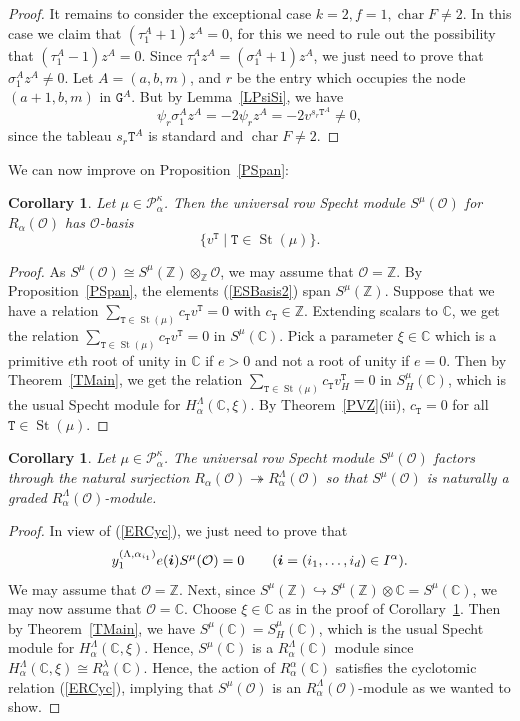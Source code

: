 \documentclass[twoside,11pt,reqno]{amsart}
\numberwithin{equation}{section}
\newtheorem{Corollary}[equation]{Corollary}
\theoremstyle{definition}  %
\def\bi{\text{\boldmath$i$}}
\newcommand{\cha}{\operatorname{char}}
\newcommand{\St}{\operatorname{St}}
\newcommand{\Z}{\mathbb{Z}}
\newcommand{\0}{{\bar 0}}
\newcommand{\1}{{\bar 1}}
\newcommand{\La}{\Lambda}
\newcommand{\al}{\alpha}
\newcommand{\si}{\sigma}
\newcommand{\C}{{\mathbb C}}
\newcommand\Par[1][]{{\mathscr P}^{\kappa#1}}
\def\T{{\mathtt T}}
\def\G{{\mathtt G}}
\def\onto{{\twoheadrightarrow}}
\def\into{{\hookrightarrow}}
\renewcommand\O{\mathcal O}
\begin{document}
\begin{proof}
It remains to consider the exceptional case $k=2,f=1,\cha F\neq 2$. In this case we claim that
$(\tau_1^A+1)z^A=0$, for this we need to rule out the possibility that $(\tau_1^A-1)z^A=0$.
Since $\tau_1^Az^A=(\si_1^A+1)z^A$, we just need to prove that $\si_1^Az^A\neq 0$. Let
$A=(a,b,m)$, and $r$ be the entry which occupies the node $(a+1,b,m)$ in $\G^A$. But by
Lemma~\ref{LPsiSi}, we have $$\psi_r \si_1^Az^A=-2\psi_rz^A=-2v^{s_r\T^A}\neq 0,$$ since the
tableau $s_r\T^A$ is standard and $\cha F\ne2$. 
\end{proof}


We can now improve on Proposition~\ref{PSpan}: %


\begin{Corollary} \label{COBasis}%
Let $\mu\in\Par_\al$. Then the universal row Specht module  $S^\mu(\O)$ for $R_\al(\O)$  has $\O$-basis
\begin{equation}\label{ESBasis2}
\{v^\T\mid \T\in\St(\mu)\}.
\end{equation}
\end{Corollary}
\begin{proof}
As $S^\mu(\O)\cong S^\mu(\Z)\otimes_\Z\O$, we may assume that $\O=\Z$. By Proposition~\ref{PSpan}, the elements (\ref{ESBasis2}) span $S^\mu(\Z)$. Suppose that we have a relation $ \sum_{\T\in\St(\mu)} c_\T v^\T=0$ with $c_\T\in\Z$.  Extending scalars to $\C$, we get the relation $\sum_{\T\in\St(\mu)} c_\T v^\T=0$ in $S^\mu(\C)$. Pick a parameter $\xi\in \C$ which is a primitive $e$th root of unity in $\C$ if $e>0$ and not a root of unity if $e=0$. Then by Theorem~\ref{TMain}, we get the relation $\sum_{\T\in\St(\mu)} c_\T v^\T_H=0$ in $S^\mu_H(\C)$, which is the usual Specht module for $H_\al^\La(\C,\xi)$. By Theorem~\ref{PVZ}(iii), $c_\T=0$ for all $\T\in\St(\mu)$.  
\end{proof}



\begin{Corollary} %
Let $\mu\in\Par_\al$. The universal row Specht module $S^\mu(\O)$ factors through the natural surjection $R_\al(\O)\onto  R_\al^\La(\O)$ so that $S^\mu(\O)$ is naturally a graded  $R_\al^\La(\O)$-module. 
\end{Corollary}
\begin{proof}
In view of (\ref{ERCyc}), we just need to prove that 
$$
y_1^{(\La,\al_{i_1})}e(\bi)S^\mu(\O)=0 \qquad(\bi=(i_1,\dots,i_d)\in I^\al).
$$
We may assume that $\O=\Z$. Next, since $S^\mu(\Z)\into S^\mu(\Z)\otimes\C=S^\mu(\C)$, we may now assume that
$\O=\C$.  Choose $\xi\in \C$ as in the proof of Corollary~\ref{COBasis}. Then by Theorem~\ref{TMain}, we have
$S^\mu(\C)=S^\mu_H(\C)$, which is the usual Specht module for $H_\al^\La(\C,\xi)$. Hence, $S^\mu(\C)$ is a
$R^\Lambda_\alpha(\C)$ module since $H_\alpha^\Lambda(\C,\xi)\cong R_\alpha^\lambda(\C)$. Hence, the action of
$R_\alpha^\alpha(\C)$ satisfies the cyclotomic relation (\ref{ERCyc}), implying that $S^\mu(\O)$ is an
$R_\al^\La(\O)$-module as we wanted to show.
\end{proof}
\end{document}
